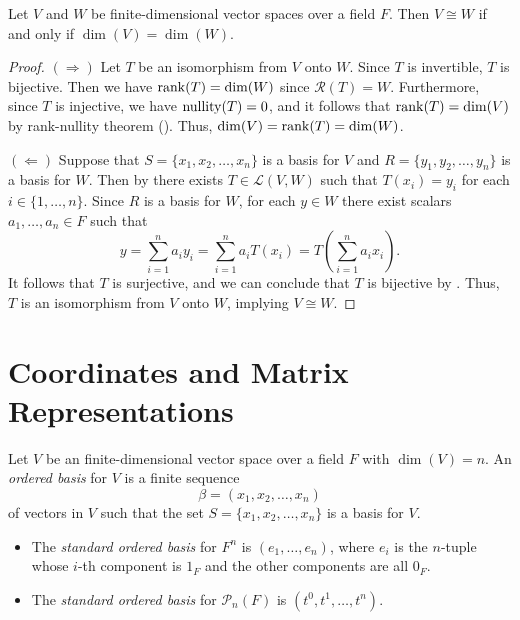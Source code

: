 \begin{theorem}
  \label{thm:isomorphism}
  Let $V$ and $W$ be finite-dimensional vector spaces over a field $F$.
  Then $V \cong W$ if and only if $\dim(V) = \dim(W)$.
\end{theorem}
\begin{proof}
  $(\Rightarrow)$
  Let $T$ be an isomorphism from $V$ onto $W$.
  Since $T$ is invertible, $T$ is bijective.
  Then we have $\operatorname{rank}(T) = \dim(W)$ since $\mathcal{R}(T) = W$.
  Furthermore, since $T$ is injective, we have $\operatorname{nullity}(T) = 0$,
  and it follows that $\operatorname{rank}(T) = \dim(V)$ by rank-nullity theorem
  ().
  Thus, $\dim(V) = \operatorname{rank}(T) = \dim(W)$.

  $(\Leftarrow)$
  Suppose that $S = \{x_1, x_2, \dots, x_n\}$ is a basis for $V$ and
  $R = \{y_1, y_2, \dots, y_n\}$ is a basis for $W$.
  Then by  there exists $T \in \mathcal{L}(V, W)$
  such that $T(x_i) = y_i$ for each $i \in \{1, \dots, n\}$.
  Since $R$ is a basis for $W$, for each $y \in W$ there exist
  scalars $a_1, \dots, a_n \in F$ such that
  \begin{equation*}
    y
    = \sum_{i=1}^n a_iy_i
    = \sum_{i=1}^n a_iT(x_i)
    = T\left(\sum_{i=1}^n a_ix_i\right).
  \end{equation*}
  It follows that $T$ is surjective, and we can conclude that $T$ is bijective
  by .
  Thus, $T$ is an isomorphism from $V$ onto $W$, implying $V \cong W$.
\end{proof}

\section{Coordinates and Matrix Representations}
\begin{definition}
  \label{def:ordered-basis}
  Let $V$ be an finite-dimensional vector space over a field $F$ with
  $\dim(V) = n$.
  An \emph{ordered basis} for $V$ is a finite sequence
  \begin{equation*}
    \beta = (x_1, x_2, \dots, x_n)
  \end{equation*}
  of vectors in $V$ such that the set $S = \{x_1, x_2, \dots, x_n\}$ is a basis
  for $V$.
\end{definition}

\begin{examples}
  \leavevmode
  \begin{itemize}
    \item The \emph{standard ordered basis} for $F^n$ is $(e_1, \dots, e_n)$,
    where $e_i$ is the $n$-tuple whose $i$-th component is $1_F$ and the other
    components are all $0_F$.
    \item The \emph{standard ordered basis} for $\mathcal{P}_n(F)$ is
    $(t^0, t^1, \dots, t^n)$.
  \end{itemize}
\end{examples}

